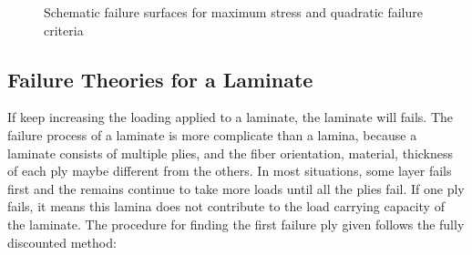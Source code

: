 \begin{figure}
\centering
{}
\caption{Schematic failure surfaces for maximum stress and quadratic failure
criteria}
\end{figure}


\subsection{Failure Theories for a Laminate}
If keep increasing the loading applied to a laminate, the laminate will fails. The failure process
of a laminate is more complicate than a lamina, because a laminate consists of multiple plies, and
the fiber orientation, material, thickness of each ply maybe different from the others. In most
situations, some layer fails first and the remains continue to take more loads until all the plies
fail.  If one ply fails, it means this lamina does not contribute to the load carrying capacity of
the laminate. The procedure for finding the first failure ply given follows the fully discounted
method:

